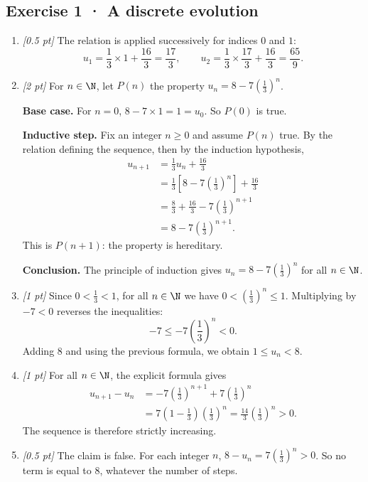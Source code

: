\subsection*{Exercise 1 · A discrete evolution}\begin{enumerate}

\item \textit{[0.5 pt]} The relation is applied successively for indices $0$ and $1$:\[u_1=\frac{1}{3}\times 1+\frac{16}{3}=\frac{17}{3},\qquad u_2=\frac{1}{3}\times \frac{17}{3}+\frac{16}{3}=\frac{65}{9}.\]

\item \textit{[2 pt]} For $n\in\N$, let $P(n)$ the property $u_n=8-7\left(\frac{1}{3}\right)^n$.
\par\smallskip\textbf{Base case.} For $n=0$, $8-7\times1=1=u_0$. So $P(0)$ is true.
\par\smallskip\textbf{Inductive step.} Fix an integer $n\ge0$ and assume $P(n)$ true. By the relation defining the sequence, then by the induction hypothesis,
\[\begin{aligned}u_{n+1}&=\frac{1}{3}u_n+\frac{16}{3}\\
&=\frac{1}{3}\left[8-7\left(\frac{1}{3}\right)^n\right]+\frac{16}{3}\\
&=\frac{8}{3}+\frac{16}{3}-7\left(\frac{1}{3}\right)^{n+1}\\
&=8-7\left(\frac{1}{3}\right)^{n+1}.
\end{aligned}\]
This is $P(n+1)$: the property is hereditary.
\par\smallskip\textbf{Conclusion.} The principle of induction gives $u_n=8-7\left(\frac{1}{3}\right)^n$ for all $n\in\N$.

\item \textit{[1 pt]} Since $0<\frac{1}{3}<1$, for all $n\in\N$ we have $0<(\frac{1}{3})^n\le1$. Multiplying by $-7<0$ reverses the inequalities:
\[-7\le-7(\frac{1}{3})^n<0.\]
Adding $8$ and using the previous formula, we obtain $1\le u_n<8$.

\item \textit{[1 pt]} For all $n\in\N$, the explicit formula gives
\[\begin{aligned}u_{n+1}-u_n&=-7(\frac{1}{3})^{n+1}+7(\frac{1}{3})^n\\&=7(1-\frac{1}{3})(\frac{1}{3})^n=\frac{14}{3}(\frac{1}{3})^n>0.\end{aligned}\]
The sequence is therefore strictly increasing.

\item \textit{[0.5 pt]} The claim is false. For each integer $n$, $8-u_n=7(\frac{1}{3})^n>0$. So no term is equal to $8$, whatever the number of steps.

\end{enumerate}

